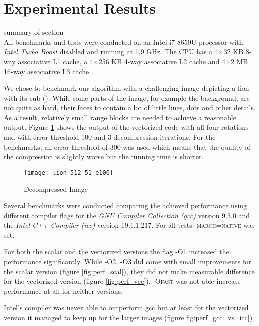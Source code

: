 \section{Experimental Results}\label{sec:exp}

summary of section\\

 All benchmarks and tests were conducted on an Intel
i7-8650U processor with \textit{Intel Turbo Boost} disabled and running at 1.9
GHz. The CPU has a 4$\times$32 KB 8-way associative L1 cache, a 4$\times$256 KB
4-way associative L2 cache and 4$\times$2 MB 16-way associative L3 cache
\cite{intel-opt-manual}.

We chose to benchmark our algorithm with a challenging image depicting a lion
with its cub (\cite{lions}). While some parts of the image, for example the
background, are not quite as hard, their faces to contain a lot of little lines,
dots and other details. As a result, relatively small range blocks are needed to
achieve a reasonable output. Figure \ref{fig:lions} shows the output of the
vectorized code with all four rotations and with error threshold 100 and 3
decompression iterations. For the benchmarks, an error threshold of 300 was used
which means that the quality of the compression is slightly worse but the
running time is shorter.

\begin{figure}[H]
  \centering
  \texttt{[image: lion\_512\_51\_e100]}
  \caption{Decompressed Image}
  \label{fig:lions}
\end{figure}


 Several benchmarks were conducted comparing the achieved
performance using different compiler flags for the \textit{GNU Compiler
  Collection (gcc)} version 9.3.0 and the \textit{Intel C++ Compiler (icc)}
version 19.1.1.217. For all tests \textsc{-march=native} was set.

For both the scalar and the vectorized versions the flag \textsc{-O1} increased
the performance significantly. While \textsc{-O2}, \textsc{-O3} did come with
small improvements for the scalar version (figure \ref{fig:perf_scal}), they did
not make measurable difference for the vectorized version (figure
\ref{fig:perf_vec}). \textsc{-Ofast} was not able increase performance at all
for neither versions.

Intel's compiler was never able to outperform gcc but at least for the
vectorized version it managed to keep up for the larger images (figure\ref{fig:perf_gcc_vs_icc})

